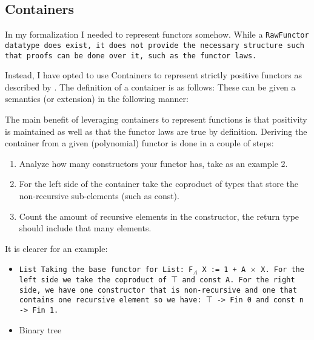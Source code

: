 
\subsection{Containers}
In my formalization I needed to represent functors somehow.
While a \tt{RawFunctor} datatype does exist, it does not provide the necessary structure such that proofs can be done over it, such as the functor laws.

Instead, I have opted to use Containers to represent strictly positive functors as described by \cite{Abbott2005}.
The definition of a container is as follows:
These can be given a semantics (or extension) in the following manner:

The main benefit of leveraging containers to represent functions is that positivity is maintained as well as that the functor laws are true by definition.
Deriving the container from a given (polynomial) functor is done in a couple of steps:
\begin{enumerate}
    \item Analyze how many constructors your functor has, take as an example 2.
    \item For the left side of the container take the coproduct of types that store the non-recursive sub-elements (such as const).
    \item Count the amount of recursive elements in the constructor, the return type should include that many elements.
\end{enumerate}
It is clearer for an example:
\begin{itemize}
    \item \tt{List}
    Taking the base functor for \tt{List}: \tt{F$_A$ X := 1 + A $\times$ X}.
    For the left side we take the coproduct of \tt{$\top$} and \tt{const A}.
    For the right side, we have one constructor that is non-recursive and one that contains one recursive element so we have:
    \tt{$\top$ -> Fin 0} and \tt{const n -> Fin 1}.
    \item Binary tree
\end{itemize}
\iffalse
- Strictly positive functors
\fi